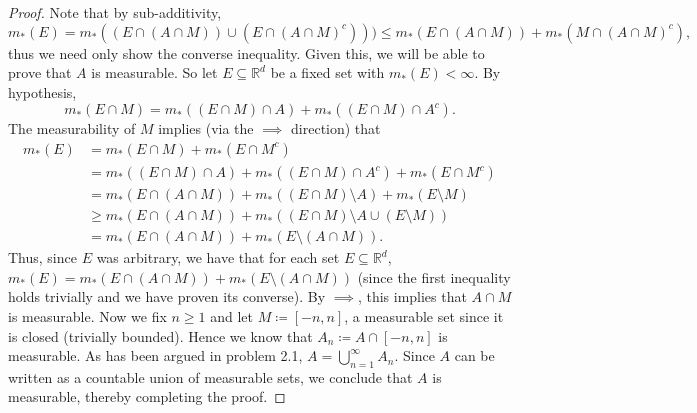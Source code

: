 \begin{proof}
Note that by sub-additivity, \[m_*(E) = m_*((E \cap (A \cap M)) \cup (E \cap (A \cap M)^{c} )) ) \leq m_*(E \cap (A \cap M))  + m_*(M \cap (A \cap M) ^{c} ), \] thus we need only show the converse inequality. Given this, we will be able to prove that \( A \) is measurable. So let \( E \subseteq \mathbb{R}^{d}  \) be a fixed set with \( m_*(E) < \infty \). By hypothesis, \[m_*(E \cap M) = m_*((E \cap M) \cap A) + m_*((E \cap M) \cap A^{c} ). \]  
The measurability of \( M \) implies (via the \( \implies  \) direction) that
\begin{align*}
	m_*(E) &= m_*(E \cap M) + m_*(E \cap M^{c} ) \\
	       &= m_*((E \cap M) \cap A) + m_*((E \cap M) \cap A^{c} ) + m_*(E \cap M^{c} ) \\
	       &=m_*(E \cap (A \cap M)) + m_*((E \cap M)\setminus A) + m_*(E \setminus M) \tag{By commutativity of \( \cap  \)} \\
	       &\geq m_*(E \cap (A \cap M	)) + m_*((E \cap M) \setminus A \cup (E \setminus M)) \tag{By sub-additivity} \\
	       &= m_*(E \cap (A \cap M)) + m_*(E \setminus (A \cap M)). \tag{Lemma 5.1}  
\end{align*}
Thus, since \( E \) was arbitrary, we have that for each set \( E \subseteq \mathbb{R}^{d}  \), \( m_*(E) = m_*(E \cap (A \cap M)) + m_*(E \setminus (A \cap M))  \) (since the first inequality holds trivially and we have proven its converse). By \( \implies  \), this implies that \( A \cap M \) is measurable. Now we fix \( n \geq 1 \) and let \( M \coloneqq [-n,n] \), a measurable set since it is closed (trivially bounded). Hence we know that \( A_n \coloneqq A \cap [-n, n] \) is measurable. As has been argued in problem 2.1, \( A = \bigcup_{n=1}^{\infty} A_n \). Since \( A \) can be written as a countable union of measurable sets, we conclude that \( A \) is measurable, thereby completing the proof. 

\end{proof}
